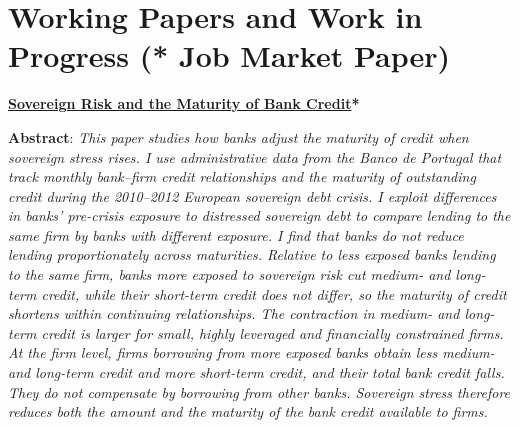 \documentclass[letterpaper,11pt]{article}
\newcommand{\paper}[3]{%
    \textbf{#1}#2\par\vspace{4pt}%
    {\small\textbf{Abstract}: \textit{#3}}\par\vspace{10pt}}
\begin{document}
\clearpage
\section*{Working Papers and Work in Progress {\normalsize\mdseries(* Job Market Paper)}}
\vspace{2pt}

\paper{\href{https://guidoardizzone.github.io/files/Ardizzone_JMP.pdf}{Sovereign Risk and the Maturity of Bank Credit}*}{}{%
This paper studies how banks adjust the maturity of credit when sovereign stress rises.
I use administrative data from the Banco de Portugal that track monthly bank--firm credit
relationships and the maturity of outstanding credit during the 2010--2012 European
sovereign debt crisis. I exploit differences in banks' pre-crisis exposure to distressed
sovereign debt to compare lending to the same firm by banks with different exposure. I
find that banks do not reduce lending proportionately across maturities. Relative to less
exposed banks lending to the same firm, banks more exposed to sovereign risk cut medium-
and long-term credit, while their short-term credit does not differ, so the maturity of
credit shortens within continuing relationships. The contraction in medium- and long-term
credit is larger for small, highly leveraged and financially constrained firms. At the
firm level, firms borrowing from more exposed banks obtain less medium- and long-term
credit and more short-term credit, and their total bank credit falls. They do not
compensate by borrowing from other banks. Sovereign stress therefore reduces both the
amount and the maturity of the bank credit available to firms.}
\end{document}
